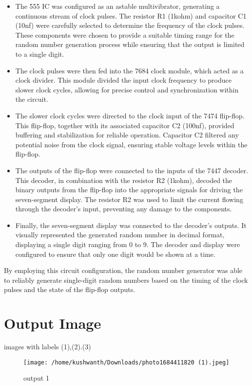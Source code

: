 \documentclass[journal,12pt,onecolumn]{IEEEtran}
\theoremstyle{remark}
\begin{document}
\begin{itemize}
    \item The 555 IC was configured as an astable multivibrator, generating a continuous stream of clock pulses. The resistor R1 (1kohm) and capacitor C1 (10nf) were carefully selected to determine the frequency of the clock pulses. These components were chosen to provide a suitable timing range for the random number generation process while ensuring that the output is limited to a single digit.
    
    \item The clock pulses were then fed into the 7684 clock module, which acted as a clock divider. This module divided the input clock frequency to produce slower clock cycles, allowing for precise control and synchronization within the circuit.
    
    \item The slower clock cycles were directed to the clock input of the 7474 flip-flop. This flip-flop, together with its associated capacitor C2 (100nf), provided buffering and stabilization for reliable operation. Capacitor C2 filtered any potential noise from the clock signal, ensuring stable voltage levels within the flip-flop.
    
    \item The outputs of the flip-flop were connected to the inputs of the 7447 decoder. This decoder, in combination with the resistor R2 (1kohm), decoded the binary outputs from the flip-flop into the appropriate signals for driving the seven-segment display. The resistor R2 was used to limit the current flowing through the decoder's input, preventing any damage to the components.
    
    \item Finally, the seven-segment display was connected to the decoder's outputs. It visually represented the generated random number in decimal format, displaying a single digit ranging from 0 to 9. The decoder and display were configured to ensure that only one digit would be shown at a time.
\end{itemize}

By employing this circuit configuration, the random number generator was able to reliably generate single-digit random numbers based on the timing of the clock pulses and the state of the flip-flop outputs.

\section{Output Image}
images with labels (1),(2).(3)
\begin{figure}[ht]
 \centering
 \texttt{[image: /home/kushwanth/Downloads/photo1684411820 (1).jpeg]}
 \label{fig:tat}
 \caption{output 1}
 \end{figure}
 
\end{document}
